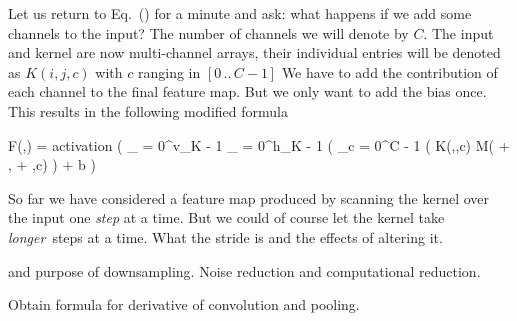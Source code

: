 \startsubsubsection[title=Multiple channels]
Let us return to Eq.~() for a minute and ask: what happens if we add some channels to the input?
The number of channels we will denote by $C$.
The input and kernel are now multi-channel arrays, their individual entries will be denoted as $K(i,j,c)$ with $c$ ranging in $[0 \, .. \, C - 1]$
We have to add the contribution of each channel to the final feature map.
But we only want to add the bias once.
This results in the following modified formula

\startplaceformula[reference=devel-feature-4]
\startformula
F(\color[red]{i},\color[red]{j}) = {\rm activation} \left( \sum_{\color[blue]{i} = 0}^{v_K - 1} \sum_{\color[blue]{j} = 0}^{h_K - 1} \left( \sum_{c = 0}^{C - 1} \Bigl( K(\color[blue]{i},\color[blue]{j},c) \cdot M(\color[red]{i} + \color[blue]{i}, \color[red]{j} + \color[blue]{j},c) \right) + b \right)
\stopformula
\stopplaceformula
\stopsubsubsection

\startsubsubsection[title=The stride]
So far we have considered a feature map produced by scanning the kernel over the input one {\em step} at a time.
But we could of course let the kernel take {\em longer} steps at a time. 
What the stride is and the effects of altering it.
\stopsubsubsection

\startsubsubsection[title=Zero padding]
\stopsubsubsection



 and purpose of downsampling.
Noise reduction and computational reduction.
\stopsubsection

\startsubsection[title=Backward Propagation]
Obtain formula for derivative of convolution and pooling.
\stopsubsection
\stopsection